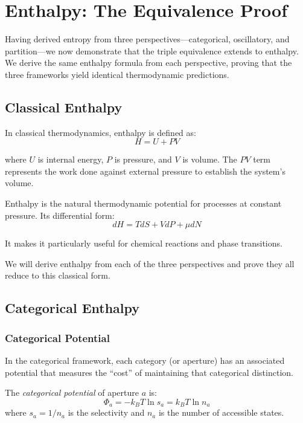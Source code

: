 \section{Enthalpy: The Equivalence Proof}
\label{sec:enthalpy}

Having derived entropy from three perspectives—categorical, oscillatory, and partition—we now demonstrate that the triple equivalence extends to enthalpy. We derive the same enthalpy formula from each perspective, proving that the three frameworks yield identical thermodynamic predictions.

\subsection{Classical Enthalpy}

In classical thermodynamics, enthalpy is defined as:
\begin{equation}
H = U + PV
\end{equation}

where $U$ is internal energy, $P$ is pressure, and $V$ is volume. The $PV$ term represents the work done against external pressure to establish the system's volume.

Enthalpy is the natural thermodynamic potential for processes at constant pressure. Its differential form:
\begin{equation}
dH = TdS + VdP + \mu dN
\end{equation}

It makes it particularly useful for chemical reactions and phase transitions.

We will derive enthalpy from each of the three perspectives and prove they all reduce to this classical form.

\subsection{Categorical Enthalpy}

\subsubsection{Categorical Potential}

In the categorical framework, each category (or aperture) has an associated potential that measures the ``cost'' of maintaining that categorical distinction.

\begin{definition}
The \textit{categorical potential} of aperture $a$ is:
\begin{equation}
\Phi_a = -k_B T \ln s_a = k_B T \ln n_a
\end{equation}
where $s_a = 1/n_a$ is the selectivity and $n_a$ is the number of accessible states.
\end{definition}

